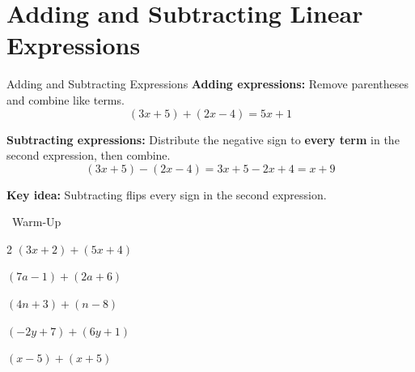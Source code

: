 \section{Adding and Subtracting Linear Expressions}

\begin{quickReview}{Adding and Subtracting Expressions}
\textbf{Adding expressions:} Remove parentheses and combine like terms.
$$(3x + 5) + (2x - 4) = 5x + 1$$

\textbf{Subtracting expressions:} Distribute the negative sign to \textbf{every term} in the second expression, then combine.
$$(3x + 5) - (2x - 4) = 3x + 5 - 2x + 4 = x + 9$$

\medskip
\textbf{Key idea:} Subtracting flips every sign in the second expression.
\end{quickReview}

\begin{practiceBox}[funGreen]{\faSun~Warm-Up}


\begin{multicols}{2}
\prob $(3x + 2) + (5x + 4)$ \answerBlank[3cm]

\prob $(7a - 1) + (2a + 6)$ \answerBlank[3cm]

\prob $(4n + 3) + (n - 8)$ \answerBlank[3cm]

\prob $(-2y + 7) + (6y + 1)$ \answerBlank[3cm]

\prob $(x - 5) + (x + 5)$ \answerBlank[3cm]
\end{multicols}
\end{practiceBox}

